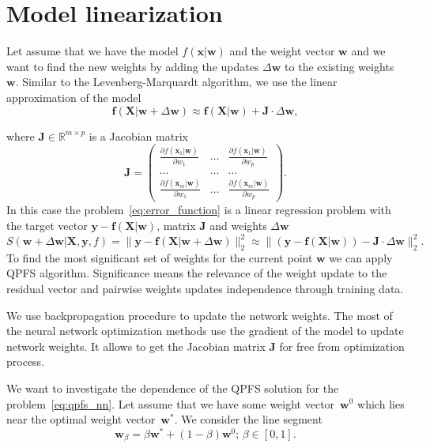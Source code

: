 \documentclass[a4paper,12pt]{article}
\theoremstyle{plain} %
\theoremstyle{definition} %
\theoremstyle{remark} %
\newcommand{\bw}{\mathbf{w}}
\newcommand{\by}{\mathbf{y}}
\newcommand{\bx}{\mathbf{x}}
\newcommand{\bJ}{\mathbf{J}}
\newcommand{\bbR}{\mathbb{R}}
\newcommand{\bX}{\mathbf{X}}
\begin{document}
  	\section*{Model linearization}
  	Let assume that we have the model $f(\bx | \bw)$ and the weight vector $\bw$ and we want to find the new weights by adding the updates $\Delta \bw$ to the existing weights $\bw$. 
  	Similar to the Levenberg-Marquardt algorithm, we use the linear approximation of the model
  	\[
	  	\mathbf{f}(\bX | \bw + \Delta \bw) \approx \mathbf{f}(\bX | \bw) + \bJ \cdot \Delta  \bw,
	\]
	
	where $\mathbf{J} \in \bbR^{m \times p}$ is a Jacobian matrix
	\begin{equation}
		\bJ = 
		\begin{pmatrix}
		\frac{\partial f(\bx_1 | \bw)}{\partial w_1} & \dots & 
		\frac{\partial f(\bx_1 | \bw)}{\partial w_p} \\
		\dots & \dots & \dots \\
		\frac{\partial f(\bx_m | \bw)}{\partial w_1} & \dots & 
		\frac{\partial f(\bx_m | \bw)}{\partial w_p}
		\end{pmatrix}.
	\end{equation}
	In this case the problem~\ref{eq:error_function} is a linear regression problem with the target vector $\by - \mathbf{f}(\bX | \bw)$, matrix $\bJ$ and weights $\Delta \bw$
	\begin{equation}
		S(\bw + \Delta \bw | \bX, \by, f) =  \| \by - \mathbf{f}(\bX | \bw + \Delta \bw)\|_2^2 \approx  \| (\by - \mathbf{f}(\bX | \bw)) - \bJ \cdot \Delta  \bw\|_2^2.
	\label{eq:qpfs_nn}
	\end{equation}
  	To find the most significant set of weights for the current point $\bw$ we can apply QPFS algorithm. 
  	Significance means the relevance of the weight update to the residual vector and pairwise weights updates independence through training data.
  	
  	We use backpropagation procedure to update the network weights. 
  	The most of the neural network optimization methods use the gradient of the model to update network weights. 
  	It allows to get the Jacobian matrix $\bJ$ for free from optimization process. 
  	
  	We want to investigate the dependence of the QPFS solution for the problem~\ref{eq:qpfs_nn}. 
  	Let assume that we have some weight vector~$\bw^0$ which lies near the optimal weight vector~$\bw^*$. 
  	We consider the line segment
  	\[
  		\bw_{\beta} = \beta \bw^* + (1 - \beta) \bw^0; \, \beta \in [0, 1] .
  	\]
  	
\end{document}
